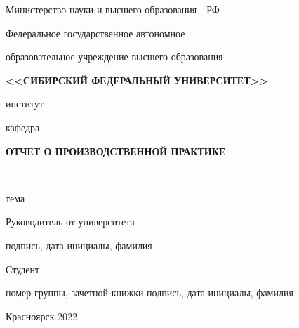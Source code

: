 \begin{spacing}{1}

    \centerline{Министерство науки и высшего образования~~РФ}

    \centerline{\small Федеральное государственное автономное}

    \centerline{\small образовательное учреждение высшего образования}

    \centerline{\small\textbf{\MakeUppercase{<<Сибирский Федеральный Университет>>}}}

    \vspace{8pt}

    \centerline{\underline{}}
    \vspace{-4pt}
    \centerline{\footnotesize институт}

    \centerline{\underline{}}
    \vspace{-4pt}
    \centerline{\footnotesize кафедра}

    \vfill
    \vfill

    \centerline{\bf\large ОТЧЕТ О ПРОИЗВОДСТВЕННОЙ ПРАКТИКЕ}
    \vspace{16pt}

    \begin{centering}

        \underline{}\\
        \underline{}

    \end{centering}

    \vspace{-4pt}
    \centerline{\footnotesize тема}

    \vfill
    \vfill

    Руководитель от университета
    \hfill
    \underline{\smash{~~~~~~~~~~~~~~~~~~~}}
    \hspace{6ex}
    \underline{}

    \vspace{-4pt}

    \hfill
    {\footnotesize подпись, дата}
    \hspace{6.5ex}
    {\footnotesize инициалы, фамилия}

    Студент~
    \underline{}
    \hfill
    \underline{\smash{~~~~~~~~~~~~~~~~~~~}}
    \hspace{6ex}
    \underline{}

    \vspace{-4pt}

    \hfill
    {\footnotesize номер группы, зачетной книжки}
    \hfill
    {\footnotesize подпись, дата}
    \hspace{6.5ex}
    {\footnotesize инициалы, фамилия}

    \vfill

    \centerline{Красноярск 2022}


\end{spacing}


\clearpage

\setcounter{page}{2}
